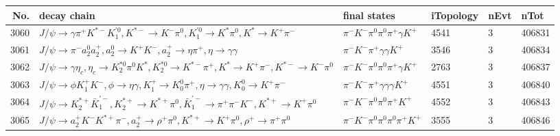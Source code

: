 \begin{table}[htbp] 
\begin{center}
\begin{small}
\begin{tabular}{rlllll}\hline\hline
 No. & decay chain & final states &  iTopology & nEvt & nTot \\\hline
3060&$J/\psi       \rightarrow \gamma       \pi^{+}        K^{*-}         K_1^{'0}      , K^{*-}          \rightarrow K^{-}          \pi^{0}        , K_1^{'0}       \rightarrow K^{*}          \pi^{0}        , K^{*}           \rightarrow K^{+}          \pi^{-}        $&$\pi^{-}        K^{-}          \pi^{0}        \pi^{0}        \pi^{+}        \gamma       K^{+}          $& 4541&    3&406831\\
3061&$J/\psi       \rightarrow \pi^{-}        a_{2}^{0}      a_{2}^{+}      , a_{2}^{0}       \rightarrow K^{+}          K^{-}          , a_{2}^{+}       \rightarrow \eta          \pi^{+}        , \eta           \rightarrow \gamma       \gamma       $&$\pi^{-}        K^{-}          \pi^{+}        \gamma       \gamma       K^{+}          $& 3546&    3&406834\\
3062&$J/\psi       \rightarrow \gamma       \eta_{c}    , \eta_{c}     \rightarrow K_2^{*0}       \pi^{0}        K^{*}          , K_2^{*0}        \rightarrow K^{*-}         \pi^{+}        , K^{*}           \rightarrow K^{+}          \pi^{-}        , K^{*-}          \rightarrow K^{-}          \pi^{0}        $&$\pi^{-}        K^{-}          \pi^{0}        \pi^{0}        \pi^{+}        \gamma       K^{+}          $& 2763&    3&406837\\
3063&$J/\psi       \rightarrow \phi           K_1^{+}        K^{-}          , \phi            \rightarrow \eta          \gamma       , K_1^{+}         \rightarrow K_0^{0}        \pi^{+}        , \eta           \rightarrow \gamma       \gamma       , K_0^{0}         \rightarrow K^{+}          \pi^{-}        $&$\pi^{-}        K^{-}          \pi^{+}        \gamma       \gamma       \gamma       K^{+}          $& 4551&    3&406840\\
3064&$J/\psi       \rightarrow K_2^{*+}       \bar{K}_1^{'-}, K_2^{*+}        \rightarrow K^{*+}         \pi^{0}        , \bar{K}_1^{'-} \rightarrow \pi^{+}        \pi^{-}        K^{-}          , K^{*+}          \rightarrow K^{+}          \pi^{0}        $&$\pi^{-}        K^{-}          \pi^{0}        \pi^{0}        \pi^{+}        K^{+}          $& 4552&    3&406843\\
3065&$J/\psi       \rightarrow a_{2}^{+}      K^{-}          K^{*+}         \pi^{-}        , a_{2}^{+}       \rightarrow \rho^{+}      \pi^{0}        , K^{*+}          \rightarrow K^{+}          \pi^{0}        , \rho^{+}       \rightarrow \pi^{+}        \pi^{0}        $&$\pi^{-}        K^{-}          \pi^{0}        \pi^{0}        \pi^{0}        \pi^{+}        K^{+}          $& 3555&    3&406846\\

\end{tabular}
\end{small}
\end{center}
\end{table}
